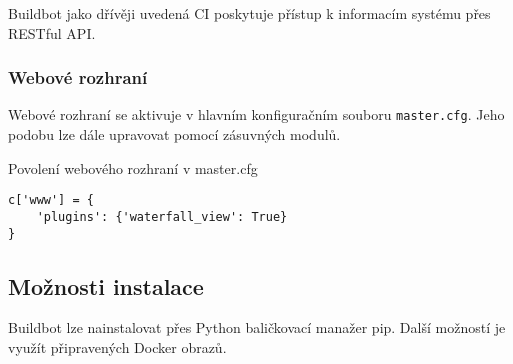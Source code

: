 Buildbot jako dřívěji uvedená CI poskytuje přístup k informacím systému přes RESTful API.

\subsubsection{Webové rozhraní}

Webové rozhraní se aktivuje v hlavním konfiguračním souboru \verb|master.cfg|.
Jeho podobu lze dále upravovat pomocí zásuvných modulů.

\begin{listing}[ht]
\caption{\label{code:buildbot-enable-web}Povolení webového rozhraní v master.cfg}
\begin{verbatim}
c['www'] = {
    'plugins': {'waterfall_view': True}
}
\end{verbatim}
\end{listing}


\subsection{Možnosti instalace}

Buildbot lze nainstalovat přes Python baličkovací manažer pip.
Další možností je využít připravených Docker obrazů.